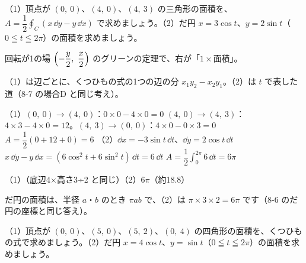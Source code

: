 \begin{reidai}
（1）頂点が $(0,\ 0)$、$(4,\ 0)$、$(4,\ 3)$ の三角形の面積を、$A=\dfrac{1}{2}\oint_C(x\,\dd y-y\,\dd x)$ で求めましょう。（2）だ円 $x=3\cos t$、$y=2\sin t$（$0\leqq t\leqq2\pi$）の面積を求めましょう。\par
\kangaekata {}\par
{}\enspace 回転が1の場 $\Bigl(-\dfrac{y}{2},\ \dfrac{x}{2}\Bigr)$ のグリーンの定理で、右が「$1\times$面積」。\par
{}\enspace（1）は辺ごとに、くつひもの式の1つの辺の分 $x_1y_2-x_2y_1$。（2）は $t$ で表した道（8-7 の場合D と同じ考え）。\par
\shiki（1）$(0,\ 0)\to(4,\ 0)$：$0\times0-4\times0=0$\kviiilq
$(4,\ 0)\to(4,\ 3)$：$4\times3-4\times0=12$。$(4,\ 3)\to(0,\ 0)$：$4\times0-0\times3=0$\kviiilq
$A=\dfrac{1}{2}(0+12+0)=6$\kviiilq
（2）$\dd x=-3\sin t\,\dd t$、$\dd y=2\cos t\,\dd t$\kviiilq
$x\,\dd y-y\,\dd x=(6\cos^2t+6\sin^2t)\,\dd t=6\,\dd t$\kviiilq
$A=\dfrac{1}{2}\int_0^{2\pi}6\,\dd t=6\pi$\par
\kotae（1）（底辺4×高さ3÷2 と同じ）\quad（2）\nobreak $6\pi$（約18.8）
\end{reidai}
\noindent だ円の面積は、半径 $a$・$b$ のとき $\pi ab$ で、（2）は $\pi\times3\times2=6\pi$ です（8-6 のだ円の座標と同じ答え）。

\begin{jibun}
（1）頂点が $(0,\ 0)$、$(5,\ 0)$、$(5,\ 2)$、$(0,\ 4)$ の四角形の面積を、くつひもの式で求めましょう。（2）だ円 $x=4\cos t$、$y=\sin t$（$0\leqq t\leqq2\pi$）の面積を求めましょう。
\end{jibun}

